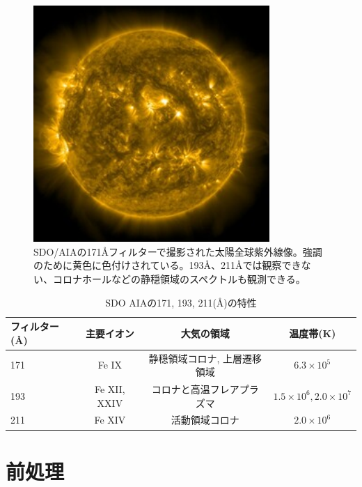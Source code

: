     \begin{figure}[h]
        \centering
        \includegraphics[width=0.8\textwidth]{figures/latest_256_0171.jpg}
        \caption{SDO/AIAの171Åフィルターで撮影された太陽全球紫外線像。強調のために黄色に色付けされている。193Å、211Åでは観察できない、コロナホールなどの静穏領域のスペクトルも観測できる。}
        \label{fig:sample_aia171}
    \end{figure}

\begin{table}[hptb]
    \centering
    \caption{SDO AIAの171, 193, 211(\AA)の特性}
    \begin{tabular}{lccc}
    \hline
    \textbf{フィルター (\AA)} & \textbf{主要イオン} & \textbf{大気の領域} & \textbf{温度帯(K)}  \\ \hline
    171 & Fe IX & 静穏領域コロナ, 上層遷移領域 & \(6.3 \times 10^{5} \) \\ \hline
    193 & Fe XII, XXIV & コロナと高温フレアプラズマ & \(1.5 \times 10^6, 2.0 \times 10^7 \)  \\ \hline
    211 & Fe XIV & 活動領域コロナ & \(2.0 \times 10^6\) \\ \hline
    \end{tabular}
    \label{table:aia_filters_details}
\end{table}





\section{前処理}

